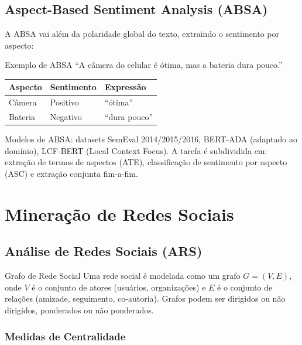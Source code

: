 \documentclass[12pt,a4paper]{article}
\begin{document}
\subsection{Aspect-Based Sentiment Analysis (ABSA)}

A ABSA vai além da polaridade global do texto, extraindo o sentimento por aspecto:

\begin{exemplobox}{Exemplo de ABSA}
``A câmera do celular é ótima, mas a bateria dura pouco.''\\[0.3em]
\begin{tabular}{lll}
\textbf{Aspecto} & \textbf{Sentimento} & \textbf{Expressão} \\
\hline
Câmera & Positivo & ``ótima'' \\
Bateria & Negativo & ``dura pouco'' \\
\end{tabular}
\end{exemplobox}

Modelos de ABSA: datasets SemEval 2014/2015/2016, BERT-ADA (adaptado ao domínio), LCF-BERT (Local Context Focus). A tarefa é subdividida em: extração de termos de aspectos (ATE), classificação de sentimento por aspecto (ASC) e extração conjunta fim-a-fim.

\section{Mineração de Redes Sociais}

\subsection{Análise de Redes Sociais (ARS)}

\begin{definicaobox}{Grafo de Rede Social}
Uma rede social é modelada como um grafo $G = (V, E)$, onde $V$ é o conjunto de atores (usuários, organizações) e $E$ é o conjunto de relações (amizade, seguimento, co-autoria). Grafos podem ser dirigidos ou não dirigidos, ponderados ou não ponderados.
\end{definicaobox}

\subsubsection{Medidas de Centralidade}
\end{document}
